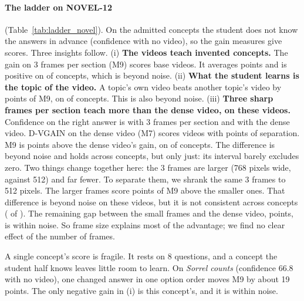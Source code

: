 \paragraph{The ladder on NOVEL-12} (Table~\ref{tab:ladder_novel}). On the \LadNovelTopics{} admitted concepts the
student does not know the answers in advance (confidence \LadNovelSBlind{} with no video), so the gain measures give
scores. Three insights follow.
(i) \textbf{The videos teach invented concepts.} The gain on 3 frames per section (M9) scores
\LadNovelDefinedNine{} base videos. It averages \NMGain{} points and is positive on \NMGainPos{} of \NMGainN{}
concepts, which is beyond noise.
(ii) \textbf{What the student learns is the topic of the video.} A topic's own video beats another topic's video by
\LadNovelSepNine{} points of M9, on \NMSpecPos{} of \NMSpecN{} concepts. This is also beyond noise.
(iii) \textbf{Three sharp frames per section teach more than the dense video, on these videos.} Confidence on the
right answer is \LadNovelSFrames{} with 3 frames per section and \LadNovelSVisual{} with the dense video. D-VGAIN on
the dense video (M7) scores \LadNovelDefinedSeven{} videos with \LadNovelSepSeven{} points of separation. M9 is
\NMFramesDense{} points above the dense video's gain, on \NMFramesDensePos{} of \NMFramesDenseN{} concepts. The
difference is beyond noise and holds across concepts, but only just: its interval barely excludes zero. Two things
change together here: the 3 frames are larger (768 pixels wide, against 512) and far fewer. To separate them, we
shrank the same 3 frames to 512 pixels. The larger frames score \NMSize{} points of M9 above the smaller ones. That
difference is beyond noise on these videos, but it is not consistent across concepts (\NMSizePos{} of \NMSizeN{}). The remaining gap between the small
frames and the dense video, \NMCount{} points, is within noise. So frame size explains most of the advantage; we find
no clear effect of the number of frames.

A single concept's score is fragile. It rests on 8 questions, and a concept the student half knows leaves little room
to learn. On \emph{Sorrel counts} (confidence 66.8 with no video), one changed answer in one option order moves M9 by
about 19 points. The only negative gain in (i) is this concept's, and it is within noise.

